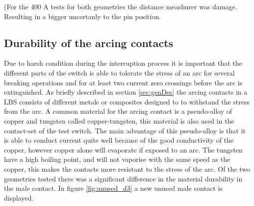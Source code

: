\documentclass[10pt,a4paper]{article} %
\begin{document}
(For the 400 A tests for both geometries the distance meashurer was damage. Resulting in a bigger uncertanly to the pin position.

\subsection{Durability of the arcing contacts}

Due to harsh condition during the interruption process it is important that the different parts of the switch is able to tolerate the stress of an arc for several breaking operations and for at least two current zero crossings before the arc is extinguished. As briefly described in section \ref{sec:genDes} the arcing contacts in a LBS consists of different metals or composites designed to to withstand the stress from the arc. A common material for the arcing contact is a pseudo-alloy of copper and tungsten called copper-tungsten, this material is also used in the contact-set of the test switch. The main advantage of this pseudo-alloy is that it is able to conduct current quite well because of the good conductivity of the copper, however copper alone will evaporate if exposed to an arc. The tungsten have a high boiling point, and will not vaporise with the same speed as the copper, this makes the contacts more resistant to the stress of the arc. Of the two geometries tested there was a significant difference in the material durability in the male contact. In figure \ref{fig:unused_d3} a new unused male contact is displayed.
\end{document}
